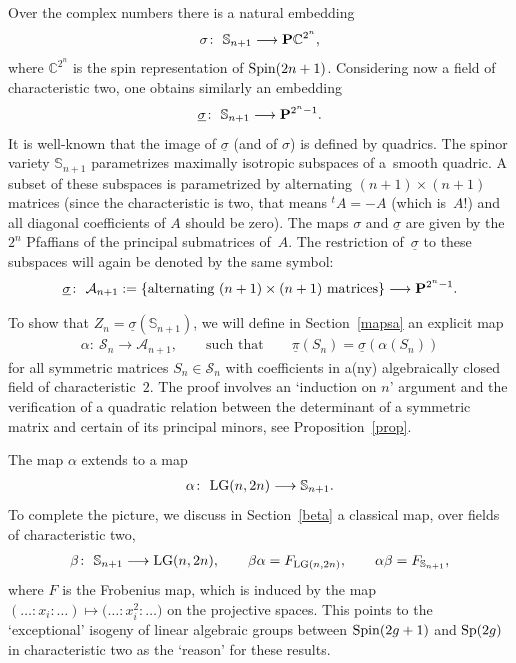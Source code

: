 \documentclass[10pt,a4paper]{amsart}
\newcommand{\CC}{{\mathbb C}}
\newcommand{\PP}{{\bf P}}
\newcommand{\bS}{{\mathbb S}}
\newcommand{\cA}{{\cal A}}
\newcommand{\cS}{{\cal S}}
\numberwithin{equation}{section}
\providecommand{\cal}{\mathcal}
\begin{document}
Over the complex numbers there is a natural embedding
\begin{gather*}
\sigma\colon \ \bS_{n+1} \longrightarrow \PP \CC^{2^n},
\end{gather*}
where $\CC^{2^n}$ is the spin representation of ${\rm Spin}(2n+1)$. Considering now a field of characteristic two, one obtains similarly an embedding
\begin{gather*}
\underline{\sigma}\colon \ \bS_{n+1} \longrightarrow \PP^{2^n-1}.
\end{gather*}
It is well-known that the image of $\underline{\sigma}$ (and of $\sigma$) is defined by quadrics. The spinor variety $\bS_{n+1}$ parametrizes maximally isotropic subspaces of a~smooth quadric. A subset of these subspaces is parametrized by alternating $(n+1)\times(n+1)$ matrices (since the characteristic is two, that means ${}^tA=-A$ (which is~$A$!) and all diagonal coefficients of $A$ should be zero). The maps $\sigma$ and $\underline{\sigma}$ are given by the $2^n$ Pfaffians of the principal submatrices of~$A$. The restriction of~$\underline{\sigma}$ to these subspaces will again be denoted by the same symbol:
\begin{gather*}
\underline{\sigma}\colon \ \cA_{n+1} := \{\text{alternating} \ (n+1)\times (n+1) \ \text{matrices} \} \longrightarrow \PP^{2^n-1}.
\end{gather*}

To show that $Z_n=\underline{\sigma}(\bS_{n+1})$, we will define in Section~\ref{mapsa}
an explicit map
\begin{gather*}
\alpha\colon \ \cS_n \longrightarrow \cA_{n+1},\qquad\text{such that}\qquad \underline{\pi}(S_n) = \underline{\sigma}(\alpha(S_n))
\end{gather*}
for all symmetric matrices $S_n\in \cS_n$ with coefficients in a(ny) algebraically closed field of characteristic~$2$. The proof involves an `induction on $n$' argument and the verification of a quadratic relation between the determinant of a symmetric matrix and certain of its principal minors, see Proposition~\ref{prop}.

The map $\alpha$ extends to a map
\begin{gather*}
\alpha\colon \ {\rm LG}(n,2n) \longrightarrow \bS_{n+1}.
\end{gather*}
To complete the picture, we discuss in Section~\ref{beta} a classical map, over fields of characteristic two,
\begin{gather*}
\beta\colon \ \bS_{n+1} \longrightarrow {\rm LG}(n,2n),\qquad \beta\alpha = F_{{\rm LG}(n,2n)},\qquad \alpha\beta = F_{\bS_{n+1}},
\end{gather*}
where $F$ is the Frobenius map, which is induced by the map $(\ldots:x_i:\ldots)\mapsto \big(\ldots:x_i^2:\ldots\big)$ on the projective spaces. This points to the `exceptional' isogeny of linear algebraic groups between ${\rm Spin}(2g+1)$ and ${\rm Sp}(2g)$ in characteristic two as the `reason' for these results.
\end{document}

